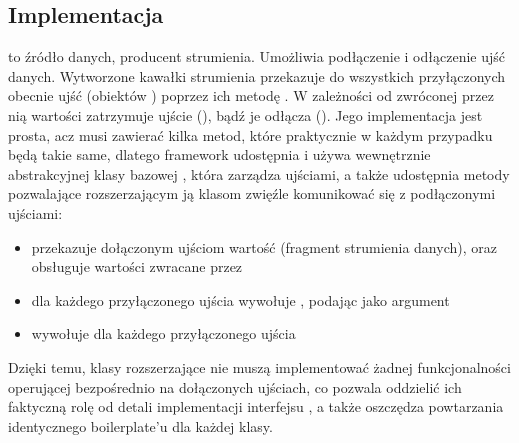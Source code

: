 \subsection{Implementacja}


 to źródło danych, producent strumienia. Umożliwia podłączenie i odłączenie ujść
danych. Wytworzone kawałki strumienia przekazuje do wszystkich przyłączonych obecnie ujść (obiektów
) poprzez ich metodę . W zależności od zwróconej przez nią wartości
zatrzymuje ujście (), bądź je odłącza (). Jego implementacja jest
prosta, acz musi zawierać kilka metod, które praktycznie w każdym przypadku będą takie same, dlatego
framework udostępnia i używa wewnętrznie abstrakcyjnej klasy bazowej ,
która zarządza ujściami, a także udostępnia metody pozwalające rozszerzającym ją klasom zwięźle
komunikować się z podłączonymi ujściami:

\begin{itemize}

  \item {} przekazuje dołączonym ujściom wartość  (fragment
    strumienia danych), oraz obsługuje wartości zwracane przez 

  \item {} dla każdego przyłączonego ujścia wywołuje ,
    podając  jako argument

  \item {} wywołuje  dla każdego przyłączonego ujścia

\end{itemize}

Dzięki temu, klasy rozszerzające  nie muszą implementować żadnej
funkcjonalności operującej bezpośrednio na dołączonych ujściach, co pozwala oddzielić ich faktyczną
rolę od detali implementacji interfejsu , a także oszczędza powtarzania
identycznego boilerplate'u dla każdej klasy.

